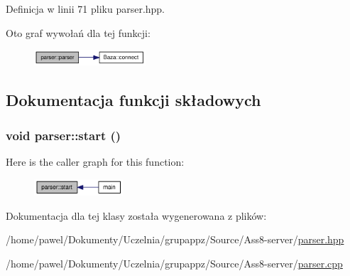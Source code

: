 Definicja w linii 71 pliku parser.hpp.

Oto graf wywołań dla tej funkcji:\nopagebreak
\begin{figure}[H]
\begin{center}
\leavevmode
\includegraphics[width=118pt]{a00002_3a237071a3ab764cd61bc53df9dd4f46_cgraph}
\end{center}
\end{figure}


\subsection{Dokumentacja funkcji składowych}
\hypertarget{a00002_7793913f528921aa22c4b6cc259a0a14}{
\subsubsection[{start}]{\setlength{\rightskip}{0pt plus 5cm}void parser::start ()}}
\label{a00002_7793913f528921aa22c4b6cc259a0a14}




Here is the caller graph for this function:\nopagebreak
\begin{figure}[H]
\begin{center}
\leavevmode
\includegraphics[width=94pt]{a00002_7793913f528921aa22c4b6cc259a0a14_icgraph}
\end{center}
\end{figure}


Dokumentacja dla tej klasy została wygenerowana z plików:\begin{CompactItemize}
\item 
/home/pawel/Dokumenty/Uczelnia/grupappz/Source/Ass8-server/\hyperlink{a00008}{parser.hpp}\item 
/home/pawel/Dokumenty/Uczelnia/grupappz/Source/Ass8-server/\hyperlink{a00007}{parser.cpp}\end{CompactItemize}
